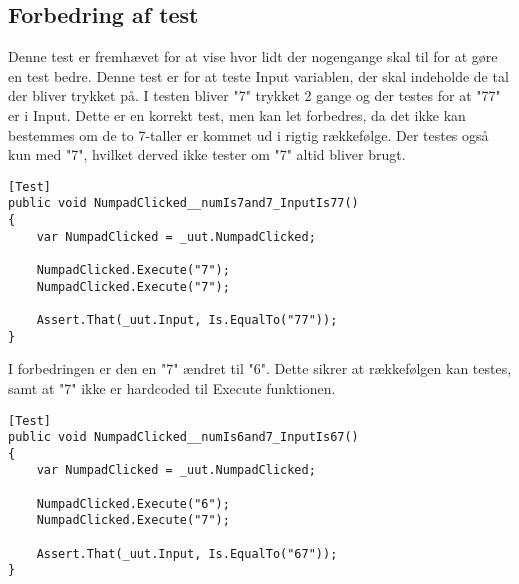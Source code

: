 \subsection{Forbedring af test}
Denne test er fremhævet for at vise hvor lidt der nogengange skal til for at gøre en test bedre. Denne test er for at teste Input variablen, der skal indeholde de tal der bliver trykket på. I testen bliver "7" trykket 2 gange og der testes for at "77" er i Input. Dette er en korrekt test, men kan let forbedres, da det ikke kan bestemmes om de to 7-taller er kommet ud i rigtig rækkefølge. Der testes også kun med "7", hvilket derved ikke tester om "7" altid bliver brugt.
\begin{lstlisting}
[Test]
public void NumpadClicked__numIs7and7_InputIs77()
{
    var NumpadClicked = _uut.NumpadClicked;

    NumpadClicked.Execute("7");
    NumpadClicked.Execute("7");

    Assert.That(_uut.Input, Is.EqualTo("77"));
}
\end{lstlisting}


I forbedringen er den en "7" ændret til "6". Dette sikrer at rækkefølgen kan testes, samt at "7" ikke er hardcoded til Execute funktionen.
\begin{lstlisting}
[Test]
public void NumpadClicked__numIs6and7_InputIs67()
{
    var NumpadClicked = _uut.NumpadClicked;

    NumpadClicked.Execute("6");
    NumpadClicked.Execute("7");

    Assert.That(_uut.Input, Is.EqualTo("67"));
}
\end{lstlisting}

